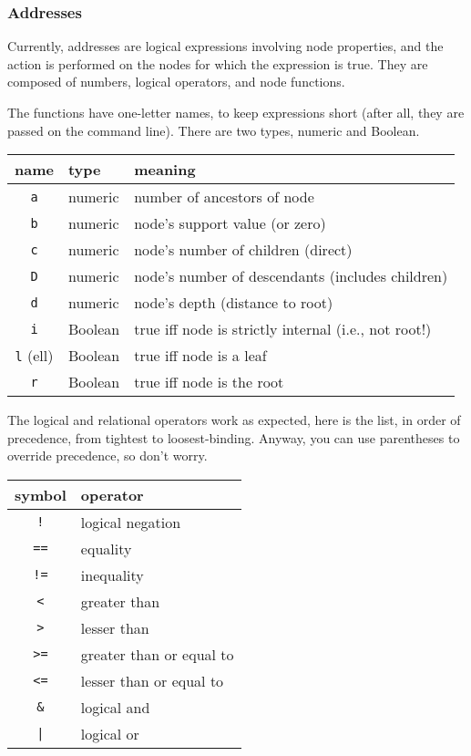 \subsubsection{Addresses}

Currently, addresses are logical expressions involving node properties, and the
action is performed on the nodes for which the expression is true. They are
composed of numbers, logical operators, and node functions.

The functions have one-letter names, to keep expressions short (after all, they are passed on the command line). There are two types, numeric and Boolean.

\begin{center}
\begin{tabular}{cll}
name & type & meaning \\
\hline
\texttt{a} & numeric & number of ancestors of node	 \\
\texttt{b} & numeric & node's support value (or zero) \\
\texttt{c} & numeric & node's number of children (direct) \\
\texttt{D} & numeric & node's number of descendants (includes children) \\
\texttt{d} & numeric & node's depth (distance to root) \\
\texttt{i} & Boolean & true iff node is strictly internal (i.e., not root!) \\
\texttt{l} (ell) & Boolean & true iff node is a leaf \\
\texttt{r} & Boolean & true iff node is the root
\end{tabular}
\end{center}

The logical and relational operators work as expected, here is the list, in
order of precedence, from tightest to loosest-binding.  Anyway, you can use
parentheses to override precedence, so don't worry.

\begin{center}
\begin{tabular}{cl}
symbol & operator \\
\hline
\texttt{!} & logical negation \\
\hline
\texttt{==} & equality \\
\texttt{!=} & inequality \\
\texttt{<} & greater than \\
\texttt{>} & lesser than \\
\texttt{>=} & greater than or equal to \\
\texttt{<=} & lesser than or equal to \\
\hline
\texttt{\&} & logical and \\
\hline
\texttt{|} & logical or
\end{tabular}
\end{center}

